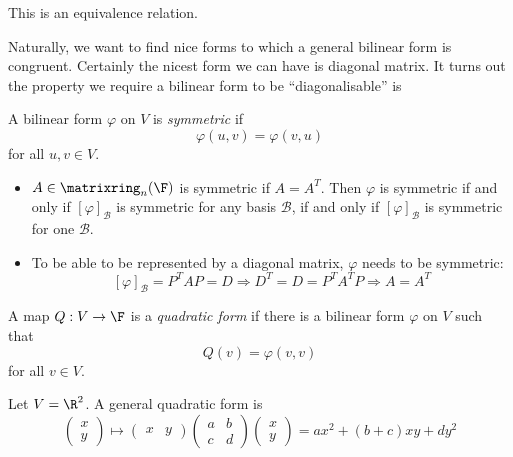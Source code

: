 \documentclass[a4paper]{article}
\newcommand*{\M}{\matrixring}
\newcommand*{\basis}{\mathcal}
\theoremstyle{definition}
\begin{document}
\begin{note}
  This is an equivalence relation.
\end{note}

Naturally, we want to find nice forms to which a general bilinear form is congruent. Certainly the nicest form we can have is diagonal matrix. It turns out the property we require a bilinear form to be ``diagonalisable'' is

\begin{definition}[Symmetric]
  A bilinear form \(\varphi\) on \(V\) is \emph{symmetric} if
  \[
    \varphi(u, v) = \varphi(v, u)
  \]
  for all \(u, v \in V\).
\end{definition}

\begin{note}\leavevmode
  \begin{itemize}
  \item \(A \in \M_n(\F)\) is symmetric if \(A = A^T\). Then \(\varphi\) is symmetric if and only if \([\varphi]_{\basis B}\) is symmetric for any basis \(\basis B\), if and only if \([\varphi]_{\basis B}\) is symmetric for one \(\basis B\).
  \item To be able to be represented by a diagonal matrix, \(\varphi\) needs to be symmetric:
    \[
      [\varphi]_{\basis B} = P^TAP = D \Rightarrow D^T = D = P^TA^TP \Rightarrow A = A^T
    \]
  \end{itemize}
\end{note}

\begin{definition}
  A map \(Q: V \to \F\) is a \emph{quadratic form} if there is a bilinear form \(\varphi\) on \(V\) such that
  \[
    Q(v) = \varphi(v, v)
  \]
  for all \(v \in V\).
\end{definition}

\begin{eg}
  Let \(V = \R^2\). A general quadratic form is
  \[
    \begin{pmatrix}
      x \\
      y
    \end{pmatrix}
    \mapsto
    \begin{pmatrix}
      x & y
    \end{pmatrix}
    \begin{pmatrix}
      a & b \\
      c & d
    \end{pmatrix}
    \begin{pmatrix}
      x \\
      y
    \end{pmatrix}
    = ax^2 + (b + c) xy + dy^2
  \]
\end{eg}
\end{document}

